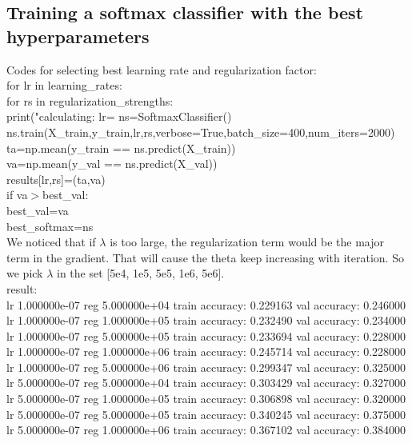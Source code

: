 \documentclass{article}
\begin{document}
\subsection{Training a softmax classifier with the best hyperparameters}
Codes for selecting best learning rate and regularization factor:\\[10pt]
for lr in learning\_rates:\\
for rs in regularization\_strengths:\\
		print("calculating: lr=%
		ns=SoftmaxClassifier()\\
		ns.train(X\_train,y\_train,lr,rs,verbose=True,batch\_size=400,num\_iters=2000)\\
		ta=np.mean(y\_train == ns.predict(X\_train))\\
		va=np.mean(y\_val == ns.predict(X\_val))\\
		results[lr,rs]=(ta,va)\\
		if va$>$best\_val:\\
			best\_val=va\\
			best\_softmax=ns\\[10pt]
We noticed that if $\lambda$ is too large, the regularization term would be the major term in the gradient. That will cause the theta keep increasing with iteration. So we pick $\lambda$ in the set  [5e4, 1e5, 5e5, 1e6, 5e6].\\
result:\\[10pt] 
lr 1.000000e-07 reg 5.000000e+04 train accuracy: 0.229163 val accuracy: 0.246000\\
lr 1.000000e-07 reg 1.000000e+05 train accuracy: 0.232490 val accuracy: 0.234000\\
lr 1.000000e-07 reg 5.000000e+05 train accuracy: 0.233694 val accuracy: 0.228000\\
lr 1.000000e-07 reg 1.000000e+06 train accuracy: 0.245714 val accuracy: 0.228000\\
lr 1.000000e-07 reg 5.000000e+06 train accuracy: 0.299347 val accuracy: 0.325000\\
lr 5.000000e-07 reg 5.000000e+04 train accuracy: 0.303429 val accuracy: 0.327000\\
lr 5.000000e-07 reg 1.000000e+05 train accuracy: 0.306898 val accuracy: 0.320000\\
lr 5.000000e-07 reg 5.000000e+05 train accuracy: 0.340245 val accuracy: 0.375000\\
lr 5.000000e-07 reg 1.000000e+06 train accuracy: 0.367102 val accuracy: 0.384000\\
\end{document}
